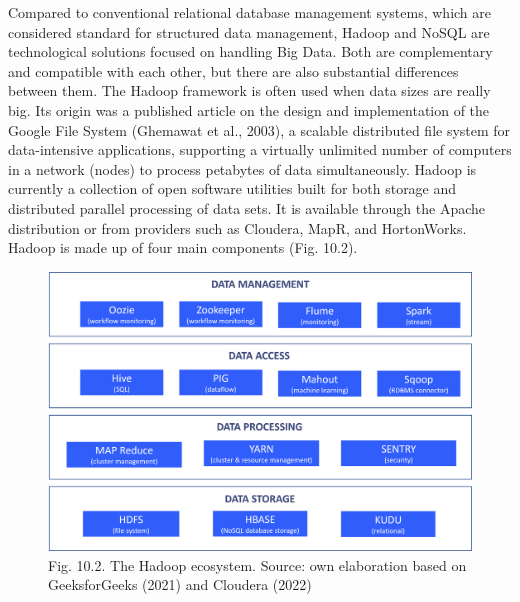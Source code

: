 \documentclass[
  letterpaper,
  DIV=11,
  numbers=noendperiod]{scrreprt}
\begin{document}
Compared to conventional relational database management systems, which
are considered standard for structured data management, Hadoop and NoSQL
are technological solutions focused on handling Big Data. Both are
complementary and compatible with each other, but there are also
substantial differences between them. The Hadoop framework is often used
when data sizes are really big. Its origin was a published article on
the design and implementation of the Google File System (Ghemawat et
al., 2003), a scalable distributed file system for data-intensive
applications, supporting a virtually unlimited number of computers in a
network (nodes) to process petabytes of data simultaneously. Hadoop is
currently a collection of open software utilities built for both storage
and distributed parallel processing of data sets. It is available
through the Apache distribution or from providers such as Cloudera,
MapR, and HortonWorks. Hadoop is made up of four main components (Fig.
10.2).

\begin{figure}

{\centering \includegraphics[width=7.29167in,height=\textheight]{img/fig12.png}

}

\caption{Fig. 10.2. The Hadoop ecosystem. Source: own elaboration based
on GeeksforGeeks (2021) and Cloudera (2022)}

\end{figure}
\end{document}
